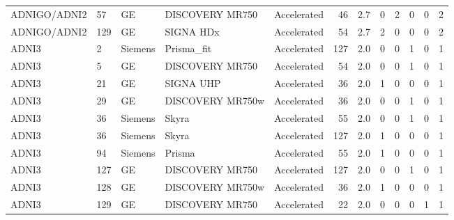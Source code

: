 \documentclass{article}
\providecommand{\DIFaddtex}[1]{{\protect\color{blue}#1}} %
\providecommand{\DIFadd}[1]{\texorpdfstring{\DIFaddtex{#1}}{#1}} %
\begin{document}
\begin{landscape}
\begin{longtable}{lllllrrrrrrr}
\DIFadd{ADNIGO/ADNI2 }& \DIFadd{57 }& \DIFadd{GE }& \DIFadd{DISCOVERY MR750 }& \DIFadd{Accelerated }& \DIFadd{46 }& \DIFadd{2.7 }& \DIFadd{0 }& \DIFadd{2 }& \DIFadd{0 }& \DIFadd{0 }& \DIFadd{2 }\\
\DIFadd{ADNIGO/ADNI2 }& \DIFadd{129 }& \DIFadd{GE }& \DIFadd{SIGNA HDx }& \DIFadd{Accelerated }& \DIFadd{54 }& \DIFadd{2.7 }& \DIFadd{2 }& \DIFadd{0 }& \DIFadd{0 }& \DIFadd{0 }& \DIFadd{2 }\\
\DIFadd{ADNI3 }& \DIFadd{2 }& \DIFadd{Siemens }& \DIFadd{Prisma\_fit }& \DIFadd{Accelerated }& \DIFadd{127 }& \DIFadd{2.0 }& \DIFadd{0 }& \DIFadd{0 }& \DIFadd{1 }& \DIFadd{0 }& \DIFadd{1 }\\
\DIFadd{ADNI3 }& \DIFadd{5 }& \DIFadd{GE }& \DIFadd{DISCOVERY MR750 }& \DIFadd{Accelerated }& \DIFadd{54 }& \DIFadd{2.0 }& \DIFadd{0 }& \DIFadd{0 }& \DIFadd{1 }& \DIFadd{0 }& \DIFadd{1 }\\
\DIFadd{ADNI3 }& \DIFadd{21 }& \DIFadd{GE }& \DIFadd{SIGNA UHP }& \DIFadd{Accelerated }& \DIFadd{36 }& \DIFadd{2.0 }& \DIFadd{1 }& \DIFadd{0 }& \DIFadd{0 }& \DIFadd{0 }& \DIFadd{1 }\\
\DIFadd{ADNI3 }& \DIFadd{29 }& \DIFadd{GE }& \DIFadd{DISCOVERY MR750w }& \DIFadd{Accelerated }& \DIFadd{36 }& \DIFadd{2.0 }& \DIFadd{0 }& \DIFadd{0 }& \DIFadd{1 }& \DIFadd{0 }& \DIFadd{1 }\\
\DIFadd{ADNI3 }& \DIFadd{36 }& \DIFadd{Siemens }& \DIFadd{Skyra }& \DIFadd{Accelerated }& \DIFadd{55 }& \DIFadd{2.0 }& \DIFadd{0 }& \DIFadd{0 }& \DIFadd{1 }& \DIFadd{0 }& \DIFadd{1 }\\
\DIFadd{ADNI3 }& \DIFadd{36 }& \DIFadd{Siemens }& \DIFadd{Skyra }& \DIFadd{Accelerated }& \DIFadd{127 }& \DIFadd{2.0 }& \DIFadd{1 }& \DIFadd{0 }& \DIFadd{0 }& \DIFadd{0 }& \DIFadd{1 }\\
\DIFadd{ADNI3 }& \DIFadd{94 }& \DIFadd{Siemens }& \DIFadd{Prisma }& \DIFadd{Accelerated }& \DIFadd{55 }& \DIFadd{2.0 }& \DIFadd{1 }& \DIFadd{0 }& \DIFadd{0 }& \DIFadd{0 }& \DIFadd{1 }\\
\DIFadd{ADNI3 }& \DIFadd{127 }& \DIFadd{GE }& \DIFadd{DISCOVERY MR750 }& \DIFadd{Accelerated }& \DIFadd{127 }& \DIFadd{2.0 }& \DIFadd{0 }& \DIFadd{0 }& \DIFadd{1 }& \DIFadd{0 }& \DIFadd{1 }\\
\DIFadd{ADNI3 }& \DIFadd{128 }& \DIFadd{GE }& \DIFadd{DISCOVERY MR750w }& \DIFadd{Accelerated }& \DIFadd{36 }& \DIFadd{2.0 }& \DIFadd{1 }& \DIFadd{0 }& \DIFadd{0 }& \DIFadd{0 }& \DIFadd{1 }\\
\DIFadd{ADNI3 }& \DIFadd{129 }& \DIFadd{GE }& \DIFadd{DISCOVERY MR750 }& \DIFadd{Accelerated }& \DIFadd{22 }& \DIFadd{2.0 }& \DIFadd{0 }& \DIFadd{0 }& \DIFadd{0 }& \DIFadd{1 }& \DIFadd{1 }\\

\end{longtable}
\end{landscape}
\end{document}
